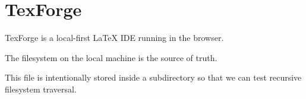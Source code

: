 \section{TexForge}

TexForge is a local-first LaTeX IDE running in the browser.

The filesystem on the local machine is the source of truth.

This file is intentionally stored inside a subdirectory so that we can test recursive filesystem traversal.
